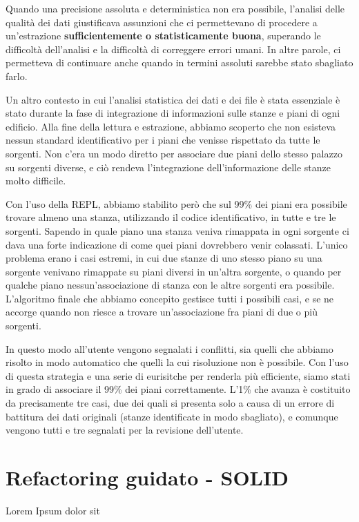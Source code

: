 \documentclass[12pt]{report}
\begin{document}
Quando una precisione assoluta e deterministica non era possibile, l'analisi delle qualità dei dati giustificava assunzioni che ci permettevano di procedere a un'estrazione \textbf{sufficientemente o statisticamente buona}, superando le difficoltà dell'analisi e la difficoltà di correggere errori umani. In altre parole, ci permetteva di continuare anche quando in termini assoluti sarebbe stato sbagliato farlo.

Un altro contesto in cui l'analisi statistica dei dati e dei file è stata essenziale è stato durante la fase di integrazione di informazioni sulle stanze e piani di ogni edificio. Alla fine della lettura e estrazione, abbiamo scoperto che non esisteva nessun standard identificativo per i piani che venisse rispettato da tutte le sorgenti. Non c'era un modo diretto per associare due piani dello stesso palazzo su sorgenti diverse, e ciò rendeva l'integrazione dell'informazione delle stanze molto difficile.

Con l'uso della REPL, abbiamo stabilito però che sul 99\% dei piani era possibile trovare almeno una stanza, utilizzando il codice identificativo, in tutte e tre le sorgenti. Sapendo in quale piano una stanza veniva rimappata in ogni sorgente ci dava una forte indicazione di come quei piani dovrebbero venir colassati. L'unico problema erano i casi estremi, in cui due stanze di uno stesso piano su una sorgente venivano rimappate su piani diversi in un'altra sorgente, o quando per qualche piano nessun'associazione di stanza con le altre sorgenti era possibile. L'algoritmo finale che abbiamo concepito gestisce tutti i possibili casi, e se ne accorge quando non riesce a trovare un'associazione fra piani di due o più sorgenti. 

In questo modo all'utente vengono segnalati i conflitti, sia quelli che abbiamo risolto in modo automatico che quelli la cui risoluzione non è possibile. Con l'uso di questa strategia e una serie di eurisitche per renderla più efficiente, siamo stati in grado di associare il 99\% dei piani correttamente. L'1\% che avanza è costituito da precisamente tre casi, due dei quali si presenta solo a causa di un errore di battitura dei dati originali (stanze identificate in modo sbagliato), e comunque vengono tutti e tre segnalati per la revisione dell'utente. 


% 
% 
\section{Refactoring guidato - SOLID}
Lorem Ipsum dolor sit
\end{document}
